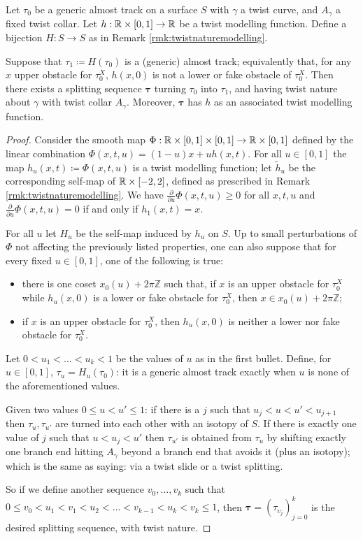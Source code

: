 \begin{lemma}\label{lem:functiongivestwist}
Let $\tau_0$ be a generic almost track on a surface $S$ with $\gamma$ a twist curve, and $A_\gamma$ a fixed twist collar. Let $h:\mathbb R\times[0,1]\rightarrow \mathbb R$ be a twist modelling function. Define a bijection $H:S\rightarrow S$ as in Remark \ref{rmk:twistnaturemodelling}.

Suppose that $\tau_1\coloneqq H(\tau_0)$ is a (generic) almost track; equivalently that, for any $x$ upper obstacle for $\tau_0^X$, $h(x,0)$ is not a lower or fake obstacle of $\tau_0^X$. Then there exists a splitting sequence $\bm\tau$ turning $\tau_0$ into $\tau_1$, and having twist nature about $\gamma$ with twist collar $A_\gamma$. Moreover, $\bm\tau$ has $h$ as an associated twist modelling function.
\end{lemma}
\begin{proof}
Consider the smooth map $\Phi:\mathbb R\times[0,1]\times[0,1]\rightarrow \mathbb R\times [0,1]$ defined by the linear combination $\Phi(x,t,u)=(1-u)x+ u h(x,t)$. For all $u\in[0,1]$ the map $h_u(x,t)\coloneqq\Phi(x,t,u)$ is a twist modelling function; let $\tilde h_u$ be the corresponding self-map of $\mathbb R\times[-2,2]$, defined as prescribed in Remark \ref{rmk:twistnaturemodelling}. We have $\frac{\partial}{\partial u}\Phi(x,t,u)\geq 0$ for all $x,t,u$ and $\frac{\partial}{\partial u}\Phi(x,t,u)= 0$ if and only if $h_1(x,t)=x$.

For all $u$ let $H_u$ be the self-map induced by $h_u$ on $S$. Up to small perturbations of $\Phi$ not affecting the previously listed properties, one can also suppose that for every fixed $u\in[0,1]$, one of the following is true:
\begin{itemize}
\item there is one coset $x_0(u)+2\pi\mathbb Z$ such that, if $x$ is an upper obstacle for $\tau_0^X$ while $h_u(x,0)$ is a lower or fake obstacle for $\tau_0^X$, then $x\in x_0(u)+2\pi\mathbb Z$;
\item if $x$ is an upper obstacle for $\tau_0^X$, then $h_u(x,0)$ is neither a lower nor fake obstacle for $\tau_0^X$.
\end{itemize}

Let $0<u_1<\ldots<u_k<1$ be the values of $u$ as in the first bullet. Define, for $u\in[0,1]$, $\tau_u=H_u(\tau_0)$: it is a generic almost track exactly when $u$ is none of the aforementioned values.

Given two values $0\leq u<u'\leq 1$: if there is a $j$ such that $u_j<u<u'<u_{j+1}$ then $\tau_u,\tau_{u'}$ are turned into each other with an isotopy of $S$. If there is exactly one value of $j$ such that $u<u_j<u'$ then $\tau_{u'}$ is obtained from $\tau_u$ by shifting exactly one branch end hitting $A_\gamma$ beyond a branch end that avoids it (plus an isotopy); which is the same as saying: via a twist slide or a twist splitting.

So if we define another sequence $v_0,\ldots,v_k$ such that $0\leq v_0<u_1<v_1<u_2<\ldots<v_{k-1}<u_k<v_k\leq 1$, then $\bm\tau=(\tau_{v_j})_{j=0}^k$ is the desired splitting sequence, with twist nature.
\end{proof}

